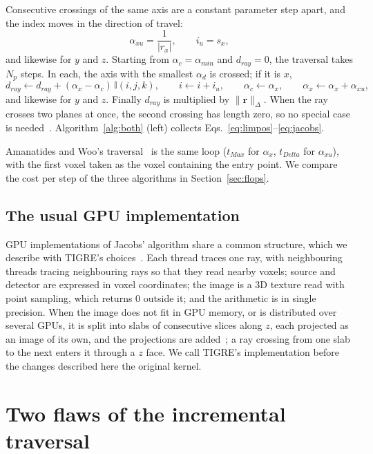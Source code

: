 \documentclass[11pt,a4paper]{article}
\theoremstyle{remark}
\newcommand{\I}{\mathbb{I}}
\begin{document}
Consecutive crossings of the same axis are a constant parameter step apart, and the index moves in the
direction of travel:
\begin{equation}
\alpha_{xu}=\frac{1}{|r_x|},\qquad i_u=s_x, \label{eq:unit}
\end{equation}
and likewise for $y$ and $z$. Starting from $\alpha_c=\alpha_{min}$ and $d_{ray}=0$, the traversal takes
$N_p$ steps. In each, the axis with the smallest $\alpha_d$ is crossed; if it is $x$,
\begin{equation}
d_{ray}\gets d_{ray}+(\alpha_x-\alpha_c)\,\I(i,j,k),\qquad
i\gets i+i_u,\qquad \alpha_c\gets\alpha_x,\qquad
\alpha_x\gets\alpha_x+\alpha_{xu}, \label{eq:jacobs}
\end{equation}
and likewise for $y$ and $z$. Finally $d_{ray}$ is multiplied by $\|\mathbf r\|_\Delta$. When the ray crosses
two planes at once, the second crossing has length zero, so no special case is needed~\cite{biguri2017}.
Algorithm~\ref{alg:both} (left) collects Eqs.~\eqref{eq:limpos}--\eqref{eq:jacobs}.

Amanatides and Woo's traversal~\cite{amanatides1987fast} is the same loop ($t_{Max}$ for $\alpha_x$,
$t_{Delta}$ for $\alpha_{xu}$), with the first voxel taken as the voxel containing the entry point. We
compare the cost per step of the three algorithms in Section~\ref{sec:flops}.

\subsection{The usual GPU implementation}
\label{sec:gpu-impl}

GPU implementations of Jacobs' algorithm share a common structure, which we describe with TIGRE's
choices~\cite{tigre2016,biguri2017}. Each thread traces one ray, with neighbouring threads tracing
neighbouring rays so that they read nearby voxels; source and detector are expressed in voxel coordinates;
the image is a 3D texture read with point sampling, which returns 0 outside it; and the arithmetic is in
single precision. When the image does not fit in GPU memory, or is distributed over several GPUs, it is split
into slabs of consecutive slices along $z$, each projected as an image of its own, and the projections are
added~\cite{tigre2020multigpu}; a ray crossing from one slab to the next enters it through a $z$ face. We
call TIGRE's implementation before the changes described here the original kernel.

\section{Two flaws of the incremental traversal}
\label{sec:flaws}
\end{document}
